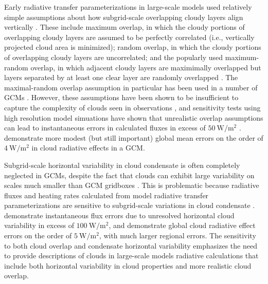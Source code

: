 \documentclass[letter]{article}
\begin{document}
Early radiative transfer parameterizations in large-scale models used relatively simple assumptions about how subgrid-scale overlapping cloudy layers align vertically \citep[e.g.,][]{collins_2001}. These include maximum overlap, in which the cloudy portions of overlapping cloudy layers are assumed to be perfectly correlated (i.e., vertically projected cloud area is minimized); random overlap, in which the cloudy portions of overlapping cloudy layers are uncorrelated; and the popularly used maximum-random overlap, in which adjacent cloudy layers are maximimally overlapped but layers separated by at least one clear layer are randomly overlapped \citep{geleyn_and_hollingsworth_1979}. The maximal-random overlap assumption in particular has been used in a number of GCMs \citep[e.g.,][]{cam3_description,cam4_description,cam5_description}. However, these assumptions have been shown to be insufficient to capture the complexity of clouds seen in observations \citep[e.g.,][]{hogan_and_illingworth_2000,mace_and_benson-troth_2002,barker_2008}, and sensitivity tests using high resolution model simuations have shown that unrealistic overlap assumptions can lead to instantaneous errors in calculated fluxes in excess of $50 ~\text{W}/\text{m}^2$ \citep{barker_et_al_1999,wu_and_liang_2005}. \cite{oreopoulos_et_al_2012} demonstrate more modest (but still important) global mean errors on the order of $4 ~\text{W}/\text{m}^2$ in cloud radiative effects in a GCM.

Subgrid-scale horizontal variability in cloud condensate is often completely neglected in GCMs, despite the fact that clouds can exhibit large variability on scales much smaller than GCM gridboxes \citep[e.g.,][]{stephens_and_platt_1987}. This is problematic because radiative fluxes and heating rates calculated from model radiative transfer parameterizations are sensitive to subgrid-scale variations in cloud condensate \citep[e.g.,][]{barker_et_al_1999,wu_and_liang_2005,oreopoulos_et_al_2012}. \cite{barker_et_al_1999} demonstrate instantaneous flux errors due to unresolved horizontal cloud variability in excess of $100 ~\text{W}/\text{m}^2$, and \cite{oreopoulos_et_al_2012} demonstrate global cloud radiative effect errors on the order of $5 ~\text{W}/\text{m}^2$, with much larger regional errors. The sensitivity to both cloud overlap and condensate horizontal variability emphasizes the need to provide descriptions of clouds in large-scale models radiative calculations that include both horizontal variability in cloud properties and more realistic cloud overlap.
\end{document}
